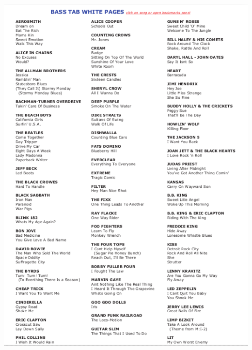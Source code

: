 \documentclass[a4paper]{book}
\begin{document}
\begin{center}
\includegraphics[width=14.286cm,height=20.025cm]{lebluessupportsmethodes-img154.png}
\end{center}
\end{document}

